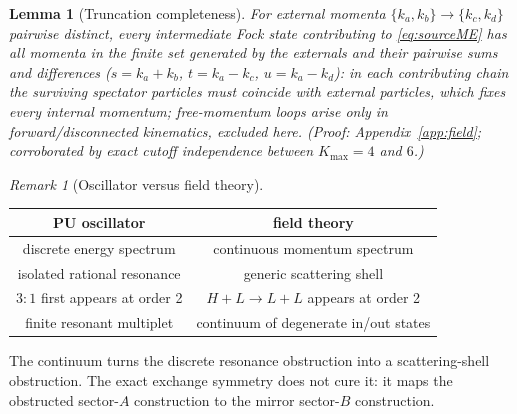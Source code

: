 \documentclass[11pt]{article}
\newtheorem{lemma}[theorem]{Lemma}
\theoremstyle{definition}
\theoremstyle{remark}
\newtheorem{remark}[theorem]{Remark}
\begin{document}
\begin{lemma}[Truncation completeness]\label{lem:trunc}
For external momenta $\{k_a,k_b\}\to\{k_c,k_d\}$ pairwise distinct,
every intermediate Fock state contributing to \eqref{eq:sourceME} has
all momenta in the finite set generated by the externals and their
pairwise sums and differences ($s=k_a+k_b$, $t=k_a-k_c$, $u=k_a-k_d$):
in each contributing chain the surviving spectator particles must
coincide with external particles, which fixes every internal momentum;
free-momentum loops arise only in forward/disconnected kinematics,
excluded here.  (Proof: Appendix~\ref{app:field}; corroborated by exact
cutoff independence between $K_{\max}=4$ and $6$.)
\end{lemma}

\begin{remark}[Oscillator versus field theory]
\begin{center}
\begin{tabular}{c|c}
PU oscillator & field theory\\
\hline
discrete energy spectrum & continuous momentum spectrum\\
isolated rational resonance & generic scattering shell\\
$3{:}1$ first appears at order 2 & $H+L\to L+L$ appears at order 2\\
finite resonant multiplet & continuum of degenerate in/out states
\end{tabular}
\end{center}
The continuum turns the discrete resonance obstruction into a
scattering-shell obstruction.  The exact exchange symmetry does not
cure it: it maps the obstructed sector-$A$ construction to the mirror
sector-$B$ construction.
\end{remark}
\end{document}
